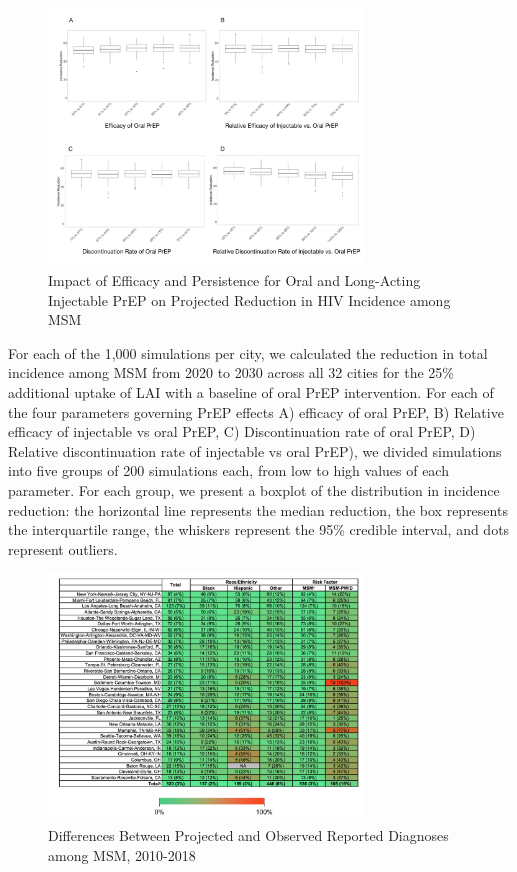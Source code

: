 \documentclass{article}
\begin{document}
\begin{figure}[H]
	\centering
	\caption{Impact of Efficacy and Persistence for Oral and Long-Acting Injectable PrEP on Projected Reduction in HIV Incidence among MSM}
	\includegraphics[width=0.75\textwidth]{images/FigureS2}
\end{figure}

For each of the 1,000 simulations per city, we calculated the reduction in total incidence among MSM from 2020 to 2030 across all 32 cities for the 25\% additional uptake of LAI with a baseline of oral PrEP intervention. For each of the four parameters governing PrEP effects A) efficacy of oral PrEP, B) Relative efficacy of injectable vs oral PrEP, C) Discontinuation rate of oral PrEP, D) Relative discontinuation rate of injectable vs oral PrEP), we divided simulations into five groups of 200 simulations each, from low to high values of each parameter. For each group, we present a boxplot of the distribution in incidence reduction: the horizontal line represents the median reduction, the box represents the interquartile range, the whiskers represent the 95\% credible interval, and dots represent outliers. 

\begin{figure}[H]
	\centering
	\caption{Differences Between Projected and Observed Reported Diagnoses among MSM, 2010-2018}
	\includegraphics[width=0.75\textwidth]{images/FigureS3}
\end{figure}
\end{document}
